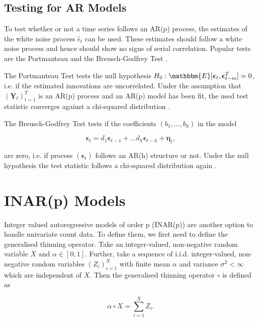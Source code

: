 \subsection{Testing for AR Models}
\label{sec: Testing for ar models}

To test whether or not a time series follows an AR(p) process, the estimates of the white noise process $\hat{\epsilon}_t$ can be used. These estimates should follow a white noise process and hence should show no signs of serial correlation. Popular tests are the Portmanteau and the Breusch-Godfrey Test \cite{Scherrer:2021}. 

The Portmanteau Test tests the null hypothesis $H_0: \mathbbm{E}[\bm{\epsilon}_t,\bm{\epsilon}_{t-m}^T]=0$, i.e. if the estimated innovations are uncorrelated. Under the assumption that $(\bm{Y}_t)_{t=1}^T$ is an AR(p) process and an AR(p) model has been fit, the used test statistic converges against a chi-squared distribution \cite{Scherrer:2021}. 

The Breusch-Godfrey Test tests if the coefficients $(b_1,\ldots,b_h)$ in the model 

\begin{equation}
\bm{\epsilon}_t = d_1\bm{\epsilon}_{t-1} +\ldots d_h \bm{\epsilon}_{t-h} + \bm{\eta}_t,
\label{eq:Breusch-Godfrey Test model}
\end{equation}

are zero, i.e. if process $(\bm{\epsilon}_t)$ follows an AR(h) structure or not. Under the null hypothesis the test statistic follows a chi-squared distribution again \cite{Scherrer:2021}. 

\section{INAR(p) Models}
\label{sec: Inar Models}

Integer valued autoregressive models of order p (INAR(p)) are another option to handle univariate count data. To define them, we first need to define the generalised thinning operator. Take an integer-valued, non-negative random variable $X$ and $\alpha \in [0,1]$. Further, take a sequence of i.i.d. integer-valued, non-negative random variables $(Z_i)_{i=1}^X$ with finite mean $\alpha$ and variance $\sigma^2<\infty $ which are independent of $X$. Then the generalised thinning operator $\circ$ is defined as

\begin{equation}
\alpha \circ X = \sum_{i=1}^X Z_i .
\label{eq:Thinning operator}
\end{equation}

